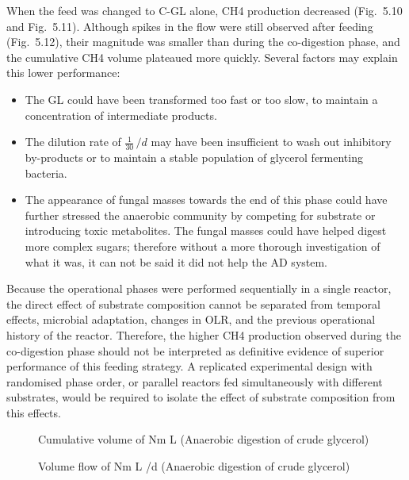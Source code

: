 \documentclass[12pt, a4paper, oneside]{report}
\begin{document}
When the feed was changed to C-GL alone, CH4 production decreased (Fig. 5.10 and Fig. 5.11). Although spikes in the flow were still observed after feeding (Fig. 5.12), their magnitude was smaller than during the co-digestion phase, and the cumulative CH4 volume plateaued more quickly. Several factors may explain this lower performance:
\begin{itemize}
    \item The GL could have been transformed too fast or too slow, to maintain a concentration of intermediate products.
    \item The dilution rate of $\frac{1}{30}\,/d$ may have been insufficient to wash out inhibitory by-products or to maintain a stable population of glycerol fermenting bacteria.
    \item The appearance of fungal masses towards the end of this phase could have further stressed the anaerobic community by competing for substrate or introducing toxic metabolites. The fungal masses could have helped digest more complex sugars; therefore without a more thorough investigation of what it was, it can not be said it did not help the AD system.
\end{itemize}

Because the operational phases were performed sequentially in a single reactor, the direct effect of substrate composition cannot be separated from temporal effects, microbial adaptation, changes in OLR, and the previous operational history of the reactor. Therefore, the higher CH4 production observed during the co-digestion phase should not be interpreted as definitive evidence of superior performance of this feeding strategy. A replicated experimental design with randomised phase order, or parallel reactors fed simultaneously with different substrates, would be required to isolate the effect of substrate composition from this effects.

\begin{figure}[H]
    \centering
    \caption{Cumulative volume of  Nm L (Anaerobic digestion of crude glycerol)}
    
\end{figure}

\begin{figure}[H]
    \centering
    \caption{Volume flow of  Nm L /d (Anaerobic digestion of crude glycerol)}
    
\end{figure}
\end{document}
